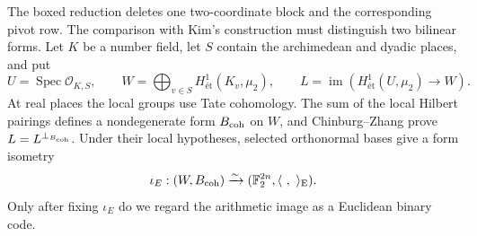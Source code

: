 \documentclass[12pt]{article}
\newcommand{\et}{\mathrm{ét}}
\begin{document}
The boxed reduction deletes one two-coordinate block and the corresponding
pivot row. The comparison with Kim's construction must distinguish two
bilinear forms. Let \(K\) be a number field, let \(S\) contain the
archimedean and dyadic places, and put
\[
U=\operatorname{Spec}\mathcal O_{K,S},\qquad
W=\bigoplus_{v\in S}H^1_{\et}(K_v,\mu_2),\qquad
L=\operatorname{im}\!\left(H^1_{\et}(U,\mu_2)\longrightarrow W\right).
\]
At real places the local groups use Tate cohomology. The sum of the local
Hilbert pairings defines a nondegenerate form \(B_{\rm coh}\) on \(W\),
and Chinburg--Zhang prove \(L=L^{\perp_{B_{\rm coh}}}\). Under their local
hypotheses, selected orthonormal bases give a form isometry
\[
\iota_E:(W,B_{\rm coh})\xrightarrow{\sim}
(\mathbb F_2^{2n},\langle\ ,\ \rangle_{\rm E}).
\]
Only after fixing \(\iota_E\) do we regard the arithmetic image as a
Euclidean binary code.
\end{document}
